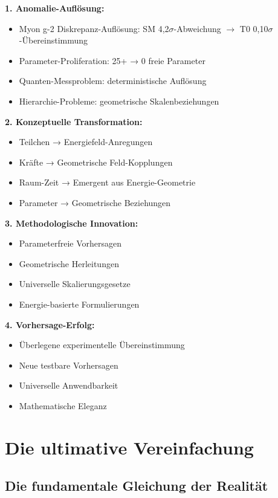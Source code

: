 \documentclass[12pt,a4paper]{report}
\begin{document}
	\textbf{1. Anomalie-Auflösung:}
	\begin{itemize}
		\item Myon g-2 Diskrepanz-Auflösung: SM 4,2$\sigma$-Abweichung $\rightarrow$ T0 0,10$\sigma$-Übereinstimmung
		\item Parameter-Proliferation: 25+ → 0 freie Parameter
		\item Quanten-Messproblem: deterministische Auflösung
		\item Hierarchie-Probleme: geometrische Skalenbeziehungen
	\end{itemize}
	
	\textbf{2. Konzeptuelle Transformation:}
	\begin{itemize}
		\item Teilchen → Energiefeld-Anregungen
		\item Kräfte → Geometrische Feld-Kopplungen
		\item Raum-Zeit → Emergent aus Energie-Geometrie
		\item Parameter → Geometrische Beziehungen
	\end{itemize}
	
	\textbf{3. Methodologische Innovation:}
	\begin{itemize}
		\item Parameterfreie Vorhersagen
		\item Geometrische Herleitungen
		\item Universelle Skalierungsgesetze
		\item Energie-basierte Formulierungen
	\end{itemize}
	
	\textbf{4. Vorhersage-Erfolg:}
	\begin{itemize}
		\item Überlegene experimentelle Übereinstimmung
		\item Neue testbare Vorhersagen
		\item Universelle Anwendbarkeit
		\item Mathematische Eleganz
	\end{itemize}
	
	\section{Die ultimative Vereinfachung}
	\label{sec:ultimate_simplification}
	
	\subsection{Die fundamentale Gleichung der Realität}
	\label{subsec:fundamental_equation}
	
\end{document}
